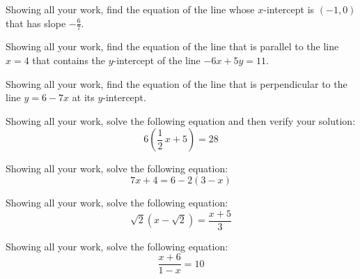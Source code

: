 \documentclass[12pt,letterpaper]{exam}
\begin{document}
\begin{questions}
\newpage
\question[10] Showing all your work, find the equation of the line whose $x$-intercept is $(-1, 0)$ that has slope $-\frac{6}{7}$. 



\newpage
\question[10] Showing all your work, find the equation of the line that is parallel to the line $x= 4$ that contains the $y$-intercept of the line $-6x + 5y= 11$. 



\newpage
\question[10] Showing all your work, find the equation of the line that is perpendicular to the line $y= 6 - 7x$ at its $y$-intercept. 



\newpage
\question[10] Showing all your work, solve the following equation and then verify your solution:
	\[
	6 \left( \dfrac{1}{2}\,x + 5 \right)= 28
	\]



\newpage
\question[10] Showing all your work, solve the following equation:
	\[
	7x + 4= 6 - 2(3 - x)
	\]



\newpage
\question[10] Showing all your work, solve the following equation:
	\[
	\sqrt{2} \left( x - \sqrt{2} \right)= \dfrac{x + 5}{3}
	\]



\newpage
\question[10] Showing all your work, solve the following equation:
	\[
	\dfrac{x + 6}{1 - x}= 10
	\]


\end{questions}
\end{document}
